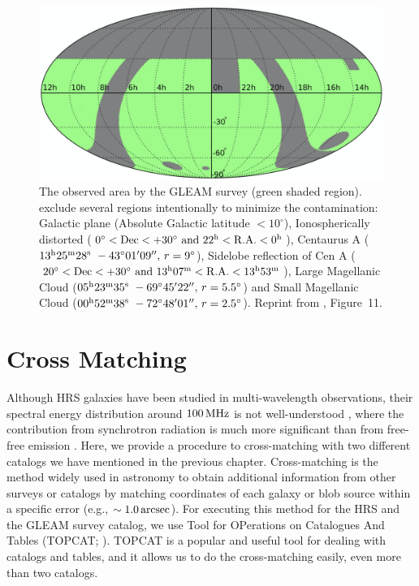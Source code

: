 \begin{figure}[htbp]
	\centering
	\includegraphics[width=.7\linewidth]{Chapter_3/Figures/HurleyWalker_Figure11.png}
    \caption[The observing area of the GLEAM survey]{\label{fig:HurleyWalker2017_figure11}
        The observed area by the GLEAM survey (green shaded region).
        \citet{Hurley-Walker2017a} exclude several regions intentionally to minimize the contamination:
        Galactic plane (Absolute Galactic latitude $<10^{\circ}$),
        Ionospherically distorted ($0^{\circ} < \mathrm{Dec} < +30^{\circ}\ \mathrm{and}\ 22^{\mathrm{h}} < \mathrm{R.A.} < 0^{\mathrm{h}}$),
        Centaurus A ($13\msu{h}25\msu{m}28\msu{s}\ -43^{\circ}01'09'',\,r=9^{\circ}$),
        Sidelobe reflection of Cen A ($20^{\circ} < \mr{Dec} < +30^{\circ}\ \mr{and}\ 13\msu{h}07\msu{m} < \mr{R.A.} < 13\msu{h}53\msu{m}$),
        Large Magellanic Cloud ($05\msu{h}23\msu{m}35\msu{s}\ -69^{\circ}45'22'',\,r=5.5^{\circ}$) and Small Magellanic Cloud ($00\msu{h}52\msu{m}38\msu{s}\ -72^{\circ}48'01'',\,r=2.5^{\circ}$).
        Reprint from \citealt{Hurley-Walker2017a}, Figure~11.
    }
\end{figure}





\section{Cross Matching}\label{sec:crossmatching}
Although HRS galaxies have been studied in multi-wavelength observations, their spectral energy distribution around $100\,\mathrm{MHz}$ is not well-understood \citep{Ciesla2014}, where the contribution from synchrotron radiation is much more significant than from free-free emission \citep{Condon1992a}.
Here, we provide a procedure to cross-matching with two different catalogs we have mentioned in the previous chapter.
Cross-matching is the method widely used in astronomy to obtain additional information from other surveys or catalogs by matching coordinates of each galaxy or blob source within a specific error (e.g., $\sim 1.0\,\mathrm{arcsec}$).
For executing this method for the HRS and the GLEAM survey catalog, we use Tool for OPerations on Catalogues And Tables (TOPCAT\@; \citealt{Taylor2009}).
TOPCAT is a popular and useful tool for dealing with catalogs and tables, and it allows us to do the cross-matching easily, even more than two catalogs.

